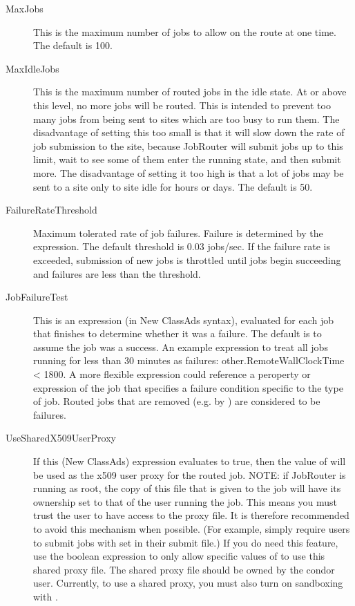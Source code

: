 \begin{description}
\begin{description}
\item[MaxJobs] This is the maximum number of jobs to allow on the route at
one time. The default is 100.

\item[MaxIdleJobs] This is the maximum number of routed jobs in the
idle state.  At or above this level, no more jobs will be routed.
This is intended to prevent too many jobs from being sent to sites
which are too busy to run them.  The disadvantage of setting this too
small is that it will slow down the rate of job submission to the
site, because JobRouter will submit jobs up to this limit, wait to see
some of them enter the running state, and then submit more.  The
disadvantage of setting it too high is that a lot of jobs may be sent
to a site only to site idle for hours or days.  The default is 50.

\item[FailureRateThreshold] Maximum tolerated rate of job failures.
Failure is determined by the  expression.  The
default threshold is 0.03 jobs/sec.  If the failure rate is exceeded,
submission of new jobs is throttled until jobs begin succeeding and
failures are less than the threshold.

\item[JobFailureTest] This is an expression (in New ClassAds syntax),
evaluated for each job that finishes to determine whether it was a
failure.  The default is to assume the job was a success.  An example
expression to treat all jobs running for less than 30 minutes as
failures: other.RemoteWallClockTime < 1800.  A more flexible
expression could reference a peroperty or expression of the job that
specifies a failure condition specific to the type of job.  Routed
jobs that are removed (e.g. by ) are considered
to be failures.

\item[UseSharedX509UserProxy] If this (New ClassAds) expression
evaluates to true, then the value of  will
be used as the x509 user proxy for the routed job.  NOTE: if JobRouter
is running as root, the copy of this file that is given to the job
will have its ownership set to that of the user running the job.  This
means you must trust the user to have access to the proxy file.  It is
therefore recommended to avoid this mechanism when possible.  (For
example, simply require users to submit jobs with 
set in their submit file.)  If you do need this feature, use the
boolean expression to only allow specific values of 
to use this shared proxy file.  The shared proxy file should be owned
by the condor user.  Currently, to use a shared proxy, you must also
turn on sandboxing with .


\end{description}
\end{description}
